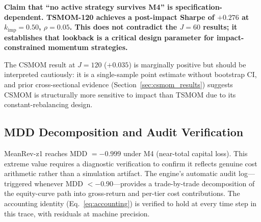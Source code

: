 \documentclass[12pt]{article}
\newcommand{\finding}[1]{\textbf{#1}}
\newcommand{\kimp}{k_{\mathrm{imp}}}
\begin{document}
\finding{Claim that ``no active strategy survives M4'' is
specification-dependent. TSMOM-120 achieves a post-impact Sharpe of
$+0.276$ at $\kimp=0.50$, $\rho=0.05$. This does not contradict the
$J=60$ results; it establishes that lookback is a critical design
parameter for impact-constrained momentum strategies.}

\noindent The CSMOM result at $J=120$ ($+0.035$) is marginally positive
but should be interpreted cautiously: it is a single-sample point
estimate without bootstrap CI, and prior cross-sectional evidence
(Section~\ref{sec:csmom_results}) suggests CSMOM is structurally more
sensitive to impact than TSMOM due to its constant-rebalancing design.

\subsection{MDD Decomposition and Audit Verification}
\label{sec:mdd_decomp}

MeanRev-z1 reaches MDD $= -0.999$ under M4 (near-total capital loss).
This extreme value requires a diagnostic verification to confirm it
reflects genuine cost arithmetic rather than a simulation artifact.
The engine's automatic audit log---triggered whenever MDD $< -0.90$---provides
a trade-by-trade decomposition of the equity-curve path into gross-return
and per-tier cost contributions. The accounting identity (Eq.~\ref{eq:accounting})
is verified to hold at every time step in this trace, with residuals
at machine precision.
\end{document}
